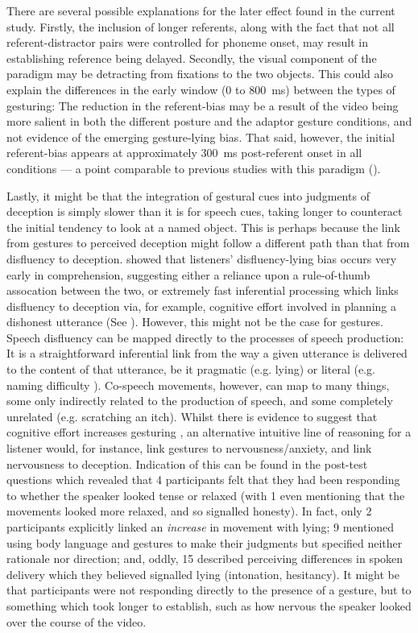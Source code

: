 \documentclass[a4paper,man,natbib]{apa6}
\begin{document}
There are several possible explanations for the later effect found in the current study.
Firstly, the inclusion of longer referents, along with the fact that not all referent-distractor pairs were controlled for phoneme onset, may result in establishing reference being delayed. 
Secondly, the visual component of the paradigm may be detracting from fixations to the two objects. 
This could also explain the differences in the early window (0 to 800~ms) between the types of gesturing: The reduction in the referent-bias may be a result of the video being more salient in both the different posture and the adaptor gesture conditions, and not evidence of the emerging gesture-lying bias.
That said, however, the initial referent-bias appears at approximately 300~ms post-referent onset in all conditions --- a point comparable to previous studies with this paradigm (\citealt{Loy2017, King2018}).

Lastly, it might be that the integration of gestural cues into judgments of deception is simply slower than it is for speech cues, taking longer to counteract the initial tendency to look at a named object. 
This is perhaps because the link from gestures to perceived deception might follow a different path than that from disfluency to deception.
\citet{Loy2017} showed that listeners' disfluency-lying bias occurs very early in comprehension, suggesting either a reliance upon a rule-of-thumb assocation between the two, or extremely fast inferential processing which links disfluency to deception via, for example, cognitive effort involved in planning a dishonest utterance (See \citealt{King2018}).
However, this might not be the case for gestures.
Speech disfluency can be mapped directly to the processes of speech production: It is a straightforward inferential link from the way a given utterance is delivered to the content of that utterance, be it pragmatic (e.g. lying) or literal (e.g. naming difficulty \citealt{Arnold2007}).
Co-speech movements, however, can map to many things, some only indirectly related to the production of speech, and some completely unrelated (e.g. scratching an itch).
Whilst there is evidence to suggest that cognitive effort increases gesturing \citep{Goldin-Meadow2001}, an alternative intuitive line of reasoning for a listener would, for instance, link gestures to nervousness/anxiety, and link nervousness to deception.
Indication of this can be found in the post-test questions which revealed that 4 participants felt that they had been responding to whether the speaker looked tense or relaxed (with 1 even mentioning that the movements looked more relaxed, and so signalled honesty).
In fact, only 2 participants explicitly linked an \textit{increase} in movement with lying; 9 mentioned using body language and gestures to make their judgments but specified neither rationale nor direction; and, oddly, 15 described perceiving differences in spoken delivery which they believed signalled lying (intonation, hesitancy). 
It might be that participants were not responding directly to the presence of a gesture, but to something which took longer to establish, such as how nervous the speaker looked over the course of the video.
\end{document}
